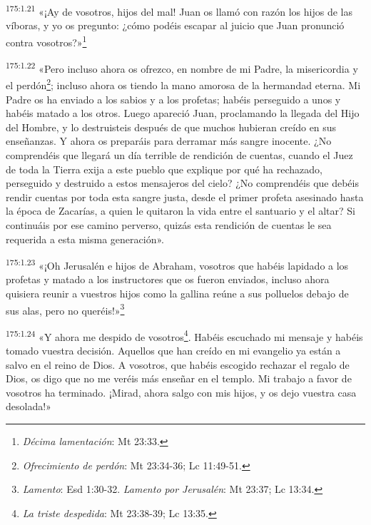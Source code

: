 \par 
\textsuperscript{175:1.21} «¡Ay de vosotros, hijos del mal! Juan os llamó con razón los hijos de las víboras, y yo os pregunto: ¿cómo podéis escapar al juicio que Juan pronunció contra vosotros?»\footnote{\textit{Décima lamentación}: Mt 23:33.}

\par 
\textsuperscript{175:1.22} «Pero incluso ahora os ofrezco, en nombre de mi Padre, la misericordia y el perdón\footnote{\textit{Ofrecimiento de perdón}: Mt 23:34-36; Lc 11:49-51.}; incluso ahora os tiendo la mano amorosa de la hermandad eterna. Mi Padre os ha enviado a los sabios y a los profetas; habéis perseguido a unos y habéis matado a los otros. Luego apareció Juan, proclamando la llegada del Hijo del Hombre, y lo destruisteis después de que muchos hubieran creído en sus enseñanzas. Y ahora os preparáis para derramar más sangre inocente. ¿No comprendéis que llegará un día terrible de rendición de cuentas, cuando el Juez de toda la Tierra exija a este pueblo que explique por qué ha rechazado, perseguido y destruido a estos mensajeros del cielo? ¿No comprendéis que debéis rendir cuentas por toda esta sangre justa, desde el primer profeta asesinado hasta la época de Zacarías, a quien le quitaron la vida entre el santuario y el altar? Si continuáis por ese camino perverso, quizás esta rendición de cuentas le sea requerida a esta misma generación».

\par 
\textsuperscript{175:1.23} «¡Oh Jerusalén e hijos de Abraham, vosotros que habéis lapidado a los profetas y matado a los instructores que os fueron enviados, incluso ahora quisiera reunir a vuestros hijos como la gallina reúne a sus polluelos debajo de sus alas, pero no queréis!»\footnote{\textit{Lamento}: Esd 1:30-32. \textit{Lamento por Jerusalén}: Mt 23:37; Lc 13:34.}

\par 
\textsuperscript{175:1.24} «Y ahora me despido de vosotros\footnote{\textit{La triste despedida}: Mt 23:38-39; Lc 13:35.}. Habéis escuchado mi mensaje y habéis tomado vuestra decisión. Aquellos que han creído en mi evangelio ya están a salvo en el reino de Dios. A vosotros, que habéis escogido rechazar el regalo de Dios, os digo que no me veréis más enseñar en el templo. Mi trabajo a favor de vosotros ha terminado. ¡Mirad, ahora salgo con mis hijos, y os dejo vuestra casa desolada!»

